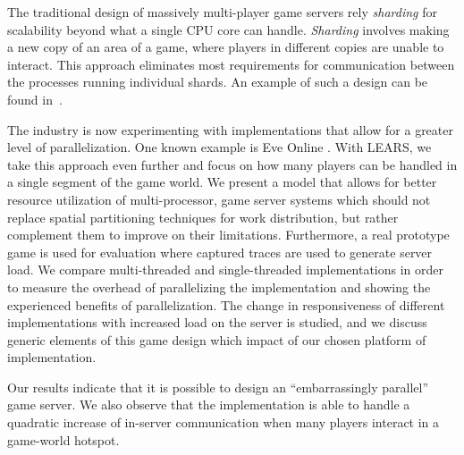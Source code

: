 The traditional design of massively multi-player game servers rely \textit{sharding} for scalability beyond what a single CPU core can handle. \textit{Sharding} involves making a new copy of an area of a game, where players in different copies are unable to interact. This approach eliminates most requirements for communication between the processes running individual shards. An example of such a design can be found in~\cite{chu-2008}.

The industry is now experimenting with
implementations that allow for a greater level of
parallelization. One known example is Eve Online \cite{drain-2008}. With LEARS, we
take this approach even further and focus on how many players can be
handled in a single segment of the game world. We present a model that
allows for better resource utilization of multi-processor, game server
systems which should not replace spatial partitioning techniques for
work distribution, but rather complement them to improve on their
limitations. Furthermore, a real prototype game is used for evaluation
where captured traces are used to generate server load. We compare
multi-threaded and single-threaded implementations in order to measure
the overhead of parallelizing the implementation and showing the
experienced benefits of parallelization. The change in responsiveness
of different implementations with increased load on the server is
studied, and we discuss generic elements of this game design which
impact of our chosen platform of implementation.

Our results indicate that it is possible to design an ``embarrassingly
parallel'' game server. We also observe that the implementation is
able to handle a quadratic increase of in-server communication when
many players interact in a game-world hotspot.

